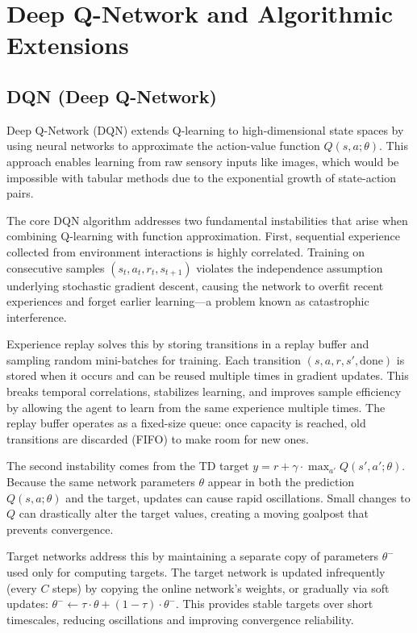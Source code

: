 \section{Deep Q-Network and Algorithmic Extensions}

\subsection{DQN (Deep Q-Network)}

Deep Q-Network (DQN) extends Q-learning to high-dimensional state spaces by using neural networks to approximate the action-value function $Q(s,a;\theta)$. This approach enables learning from raw sensory inputs like images, which would be impossible with tabular methods due to the exponential growth of state-action pairs.

The core DQN algorithm addresses two fundamental instabilities that arise when combining Q-learning with function approximation. First, sequential experience collected from environment interactions is highly correlated. Training on consecutive samples $(s_t, a_t, r_t, s_{t+1})$ violates the independence assumption underlying stochastic gradient descent, causing the network to overfit recent experiences and forget earlier learning---a problem known as catastrophic interference.

Experience replay solves this by storing transitions in a replay buffer and sampling random mini-batches for training. Each transition $(s, a, r, s', \text{done})$ is stored when it occurs and can be reused multiple times in gradient updates. This breaks temporal correlations, stabilizes learning, and improves sample efficiency by allowing the agent to learn from the same experience multiple times. The replay buffer operates as a fixed-size queue: once capacity is reached, old transitions are discarded (FIFO) to make room for new ones.

The second instability comes from the TD target $y = r + \gamma \cdot \max_{a'} Q(s', a'; \theta)$. Because the same network parameters $\theta$ appear in both the prediction $Q(s,a;\theta)$ and the target, updates can cause rapid oscillations. Small changes to $Q$ can drastically alter the target values, creating a moving goalpost that prevents convergence.

Target networks address this by maintaining a separate copy of parameters $\theta^-$ used only for computing targets. The target network is updated infrequently (every $C$ steps) by copying the online network's weights, or gradually via soft updates: $\theta^- \leftarrow \tau \cdot \theta + (1-\tau) \cdot \theta^-$. This provides stable targets over short timescales, reducing oscillations and improving convergence reliability.

